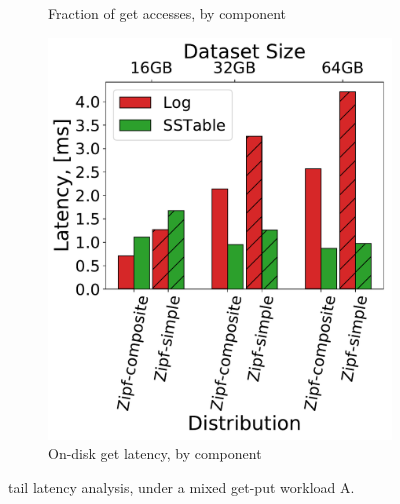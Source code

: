 {\begin{figure}[tb]
\begin{subfigure}{0.32\linewidth}
\caption{Fraction of get accesses, by component}
\label{fig:tail_latency:dist}
\end{subfigure}
\begin{subfigure}{0.31\linewidth}
\includegraphics[width=\textwidth]{figs/Latency_A.pdf}
\caption{On-disk get latency, by component}
\label{fig:tail_latency:disk}
\end{subfigure}
\label{fig:tail_latency}
\caption{{\sys\/ tail latency analysis, under a mixed get-put workload A.}}
\end{figure}
}

